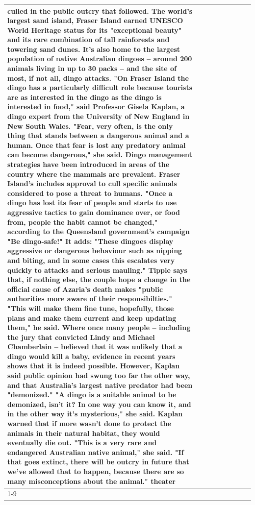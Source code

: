 \begin{table}[H]
\begin{tabular}{lllrlllll}
culled in the public outcry that followed. The world's largest sand island, Fraser Island earned UNESCO World Heritage status for its "exceptional beauty" and its rare combination of tall rainforests and towering sand dunes. It's also home to the largest population of native Australian dingoes -- around 200 animals living in up to 30 packs -- and the site of most, if not all, dingo attacks. "On Fraser Island the dingo has a particularly difficult role because tourists are as interested in the dingo as the dingo is interested in food," said Professor Gisela Kaplan, a dingo expert from the University of New England in New South Wales. "Fear, very often, is the only thing that stands between a dangerous animal and a human. Once that fear is lost any predatory animal can become dangerous," she said. Dingo management strategies have been introduced in areas of the country where the mammals are prevalent. Fraser Island's includes approval to cull specific animals considered to pose a threat to humans. "Once a dingo has lost its fear of people and starts to use aggressive tactics to gain dominance over, or food from, people the habit cannot be changed," according to the Queensland government's campaign "Be dingo-safe!" It adds: "These dingoes display aggressive or dangerous behaviour such as nipping and biting, and in some cases this escalates very quickly to attacks and serious mauling." Tipple says that, if nothing else, the couple hope a change in the official cause of Azaria's death makes "public authorities more aware of their responsibilties." "This will make them fine tune, hopefully, those plans and make them current and keep updating them," he said. Where once many people -- including the jury that convicted Lindy and Michael Chamberlain -- believed that it was unlikely that a dingo would kill a baby, evidence in recent years shows that it is indeed possible. However, Kaplan said public opinion had swung too far the other way, and that Australia's largest native predator had been "demonized." "A dingo is a suitable animal to be demonized, isn't it? In one way you can know it, and in the other way it's mysterious," she said. Kaplan warned that if more wasn't done to protect the animals in their natural habitat, they would eventually die out. "This is a very rare and endangered Australian native animal," she said. "If that goes extinct, there will be outcry in future that we've allowed that to happen, because there are so many misconceptions about the animal." theater \\
\cline{1-9}

\end{tabular}
\end{table}
